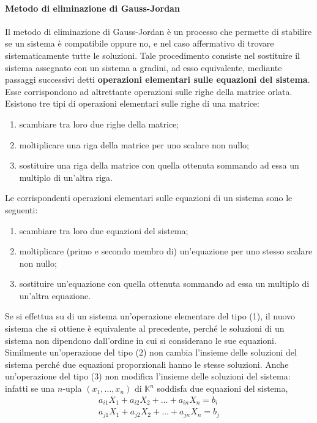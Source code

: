 \documentclass{article}
\theoremstyle{plain}
\theoremstyle{definition}
\theoremstyle{remark}
\begin{document}
\paragraph{Metodo di eliminazione di Gauss-Jordan}
Il metodo di eliminazione di Gauss-Jordan è un processo che permette di stabilire se un sistema è compatibile oppure no, e nel caso affermativo di trovare 
sistematicamente tutte le soluzioni. Tale procedimento consiste nel sostituire il sistema assegnato con un sistema a gradini, ad esso equivalente, mediante 
passaggi successivi detti \textbf{operazioni elementari sulle equazioni del sistema}. Esse corrispondono ad altrettante operazioni sulle righe della matrice orlata.
Esistono tre tipi di operazioni elementari sulle righe di una matrice:
\begin{enumerate}
    \item scambiare tra loro due righe della matrice;
    \item moltiplicare una riga della matrice per uno scalare non nullo;
    \item sostituire una riga della matrice con quella ottenuta sommando ad essa un multiplo di un'altra riga.
\end{enumerate}
Le corrispondenti operazioni elementari sulle equazioni di un sistema sono le seguenti:
\begin{enumerate}
    \item scambiare tra loro due equazioni del sistema;
    \item moltiplicare (primo e secondo membro di) un'equazione per uno stesso scalare non nullo;
    \item sostituire un'equazione con quella ottenuta sommando ad essa un multiplo di un'altra equazione.
\end{enumerate}
Se si effettua su di un sistema un'operazione elementare del tipo (1), il nuovo sistema che si ottiene è equivalente al precedente, 
perché le soluzioni di un sistema non dipendono dall'ordine in cui si considerano le sue equazioni. 
Similmente un'operazione del tipo (2) non cambia l'insieme delle soluzioni del sistema perché due equazioni proporzionali hanno le stesse soluzioni. 
Anche un'operazione del tipo (3) non modifica l'insieme delle soluzioni del sistema: 
infatti se una \( n \)-upla \( (x_1, \ldots, x_n) \) di \( \mathbb{K}^n \) soddisfa due equazioni del sistema,
\begin{equation}
    \begin{matrix}
        a_{i1}X_1 + a_{i2}X_2 + \ldots + a_{in}X_n = b_i\\
        a_{j1}X_1 + a_{j2}X_2 + \ldots + a_{jn}X_n = b_j\\
    \end{matrix}\label{sistadueuno}
\end{equation}
\end{document}
